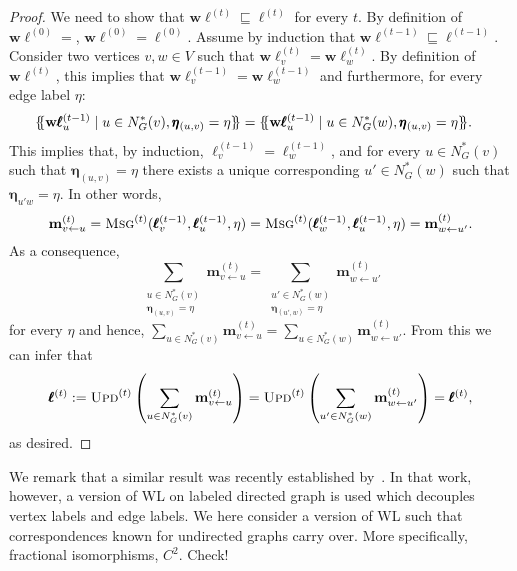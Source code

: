 \documentclass[10pt,a4paper]{article}
\theoremstyle{definition}
\newcommand*{\lmset}{\{\mskip-5mu\{}
\newcommand*{\rmset}{\}\mskip-5mu\}}
\begin{document}
\begin{proof}
We need to show that $\mathbf{w}\pmb{\ell}^{(t)}\sqsubseteq \pmb{\ell}^{(t)}$ for every $t$.
By definition of $\mathbf{w}\pmb{\ell}^{(0)}=$, $\mathbf{w}\pmb{\ell}^{(0)}=\pmb{\ell}^{(0)}$.
Assume by induction that $\mathbf{w}\pmb{\ell}^{(t-1)}\sqsubseteq \pmb{\ell}^{(t-1)}$. Consider
two vertices $v,w\in V$ such that $\mathbf{w}\pmb{\ell}^{(t)}_v=\mathbf{w}\pmb{\ell}^{(t)}_w$.
By definition of $\mathbf{w}\pmb{\ell}^{(t)}$, this implies that 
$\mathbf{w}\pmb{\ell}^{(t-1)}_v=\mathbf{w}\pmb{\ell}^{(t-1)}_w$ and furthermore, for every
edge label $\eta$:
\begin{align*}
	\lmset \mathbf{w}\pmb{\ell}^{(t-1)}_u\mid u\in N_G^*(v), \pmb{\eta}_{(u,v)}=\eta\rmset&=	\lmset \mathbf{w}\pmb{\ell}^{(t-1)}_u\mid u\in N_G^*(w), \pmb{\eta}_{(u,v)}=\eta\rmset.
\end{align*}
This implies that, by induction, $\pmb{\ell}^{(t-1)}_v=\pmb{\ell}^{(t-1)}_w$, and for every $u\in N_G^*(v)$ such that
$\pmb{\eta}_{(u,v)}=\eta$  there exists a unique corresponding $u'\in N_G^*(w)$ such that $\pmb{\eta}_{u'w}=\eta$. In other words,
$$
\mathbf{m}^{(t)}_{v\gets u}=\textsc{Msg}^{(t)}(\pmb{\ell}^{(t-1)}_v,\pmb{\ell}^{(t-1)}_u,\eta)=
\textsc{Msg}^{(t)}(\pmb{\ell}^{(t-1)}_w,\pmb{\ell}^{(t-1)}_u,\eta)=\mathbf{m}^{(t)}_{w\gets u'}.$$
As a consequence,
$$
\sum_{\substack{u\in N_G^*(v)\\\pmb{\eta}_{(u,v)}=\eta}} \mathbf{m}^{(t)}_{v\gets u}=\sum_{\substack{u'\in N_G^*(w)\\\pmb{\eta}_{(u',w)}=\eta}} \mathbf{m}^{(t)}_{w\gets u'}
$$
for every $\eta$ and hence, $\sum_{u\in N_G^*(v)}\mathbf{m}^{(t)}_{v\gets u}=
\sum_{u\in N_G^*(w)}\mathbf{m}^{(t)}_{w\gets u'}
$. From this we can infer that
$$
\pmb{\ell}^{(t)}:=\textsc{Upd}^{(t)}\left(\sum_{u\in N_G^*(v)}\mathbf{m}^{(t)}_{v\gets u}\right)=\textsc{Upd}^{(t)}\left(\sum_{u'\in N_G^*(w)}\mathbf{m}^{(t)}_{w\gets u'}\right)=\pmb{\ell}^{(t)},
$$
as desired.
%
\end{proof}

We remark that a similar result was recently established by~\citet{Jaume2019}. In that work, however, a version of WL on labeled directed graph is used which decouples vertex labels and edge labels. We here consider a version of WL such that correspondences known for undirected graphs carry over. More specifically,
fractional isomorphisms, $C^2$. Check!
%
%
\end{document}

